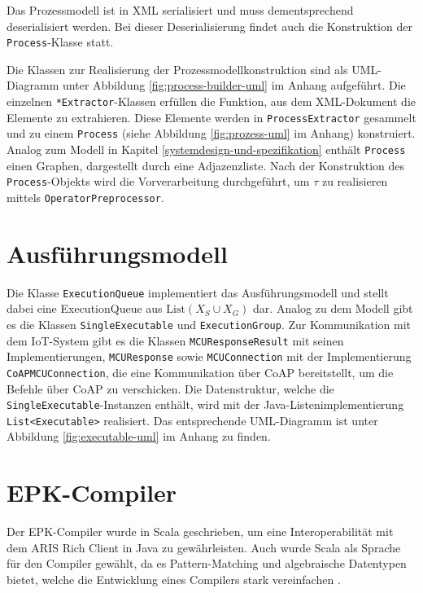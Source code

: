 Das Prozessmodell ist in \ac{XML} serialisiert und muss dementsprechend deserialisiert werden. Bei dieser Deserialisierung findet
auch die Konstruktion der \texttt{Process}-Klasse statt.

\noindent Die Klassen zur Realisierung der Prozessmodellkonstruktion sind als \ac{UML}-Diagramm unter Abbildung \ref{fig:process-builder-uml} im Anhang aufgeführt.
Die einzelnen \texttt{*Extractor}-Klassen erfüllen die Funktion, aus dem \ac{XML}-Dokument die Elemente zu extrahieren. Diese Elemente werden in \texttt{ProcessExtractor} gesammelt
und zu einem \texttt{Process} (siehe Abbildung \ref{fig:prozess-uml} im Anhang) konstruiert. Analog zum Modell in Kapitel \ref{systemdesign-und-spezifikation} enthält \texttt{Process} 
einen Graphen, dargestellt durch eine Adjazenzliste. Nach der Konstruktion des \texttt{Process}-Objekts wird die Vorverarbeitung durchgeführt, um $\tau$ zu
realisieren mittels \texttt{OperatorPreprocessor}.

\section{Ausführungsmodell}

Die Klasse \texttt{ExecutionQueue} implementiert das Ausführungsmodell und stellt dabei eine ExecutionQueue aus $\text{List}(X_S \cup X_G)$ dar. Analog zu dem Modell gibt es
die Klassen \texttt{SingleExecutable} und \texttt{ExecutionGroup}. Zur Kommunikation mit dem IoT-System gibt es die Klassen \texttt{MCUResponseResult} mit seinen Implementierungen,
\texttt{MCUResponse} sowie \texttt{MCUConnection} mit der Implementierung \texttt{CoAPMCUConnection}, die eine Kommunikation über CoAP bereitstellt, um die Befehle über CoAP zu verschicken.
Die Datenstruktur, welche die \texttt{SingleExecutable}-Instanzen enthält, wird mit der Java-Listenimplementierung \texttt{List<Executable>} realisiert.
Das entsprechende \ac{UML}-Diagramm ist unter Abbildung \ref{fig:executable-uml} im Anhang zu finden.

\section{EPK-Compiler}
Der EPK-Compiler wurde in Scala geschrieben, um eine Interoperabilität mit dem ARIS Rich Client in Java zu gewährleisten.
Auch wurde Scala als Sprache für den Compiler gewählt, da es Pattern-Matching und algebraische Datentypen bietet, welche die
Entwicklung eines Compilers stark vereinfachen \cite{zhang_pattern_2018} \cite{odersky_overview_2004}.

